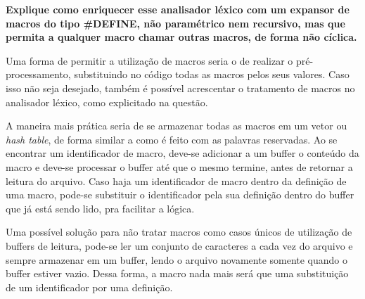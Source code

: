 
\textbf{Explique como enriquecer esse analisador léxico com um expansor de macros do tipo \#DEFINE, não paramétrico nem recursivo, mas que permita a qualquer macro chamar outras macros, de forma não cíclica.}

Uma forma de permitir a utilização de macros seria o de realizar o pré-processamento, substituindo no código todas as macros pelos seus valores. Caso isso não seja desejado, também é possível acrescentar o tratamento de macros no analisador léxico, como explicitado na questão.

A maneira mais prática seria de se armazenar todas as macros em um vetor ou \emph{hash table}, de forma similar a como é feito com as palavras reservadas. Ao se encontrar um identificador de macro, deve-se adicionar a um buffer o conteúdo da macro e deve-se processar o buffer até que o mesmo termine, antes de retornar a leitura do arquivo. Caso haja um identificador de macro dentro da definição de uma macro, pode-se substituir o identificador pela sua definição dentro do buffer que já está sendo lido, pra facilitar a lógica.

Uma possível solução para não tratar macros como casos únicos de utilização de buffers de leitura, pode-se ler um conjunto de caracteres a cada vez do arquivo e sempre armazenar em um buffer, lendo o arquivo novamente somente quando o buffer estiver vazio. Dessa forma, a macro nada mais será que uma substituição de um identificador por uma definição.
